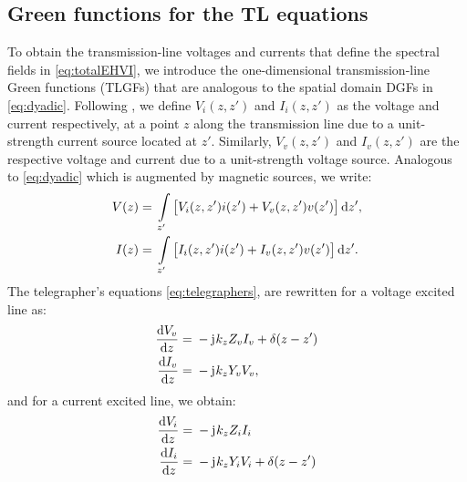 \documentclass[12pt]{article}
\begin{document}
\subsection{Green functions for the TL equations}
%
To obtain the transmission-line voltages and currents that define the spectral fields in \eqref{eq:totalEHVI}, we introduce the one-dimensional transmission-line Green functions (TLGFs) that are analogous to the spatial domain DGFs in \eqref{eq:dyadic}. Following \cite{Felsen1994,Michalski2005}, we define $V_i(z,z')$ and $I_i(z,z')$ as the voltage and current respectively, at a point $z$ along the transmission line due to a unit-strength current source located at $z'$. Similarly, $V_v(z,z')$ and $I_v(z,z')$ are the respective voltage and current due to a unit-strength voltage source. Analogous to \eqref{eq:dyadic} which is augmented by magnetic sources, we write:
%
\begin{subequations}
  \begin{align}
    V(z) ={}& \int\limits_{z'} \left[ V_i(z,z') i(z') + V_v(z,z') v(z') \right] \mathop{}\!\mathrm{d}{z'},
    \label{eq:TLGF_V}\\
    I(z) ={}& \int\limits_{z'} \left[ I_i(z,z') i(z') + I_v(z,z') v(z') \right] \mathop{}\!\mathrm{d}{z'}.
    \label{eq:TLGF_I}
  \end{align}
  \label{eq:TLGF_analogy}%
\end{subequations}
%
The telegrapher's equations \eqref{eq:telegraphers}, are rewritten for a voltage excited line as:
%
\begin{subequations}
  \begin{align}
    \dv{V_v}{z} ={}& -\mathrm{j}\mkern1mu k_z Z_v I_v + \delta(z - z')
    \label{eq:TLGF_V_v}\\
    \dv{I_v}{z} ={}& -\mathrm{j}\mkern1mu k_z Y_v V_v,
    \label{eq:TLGF_I_v}
  \end{align}
  \label{eq:TLGF_v_telelgraphers}%
\end{subequations}
%
and for a current excited line, we obtain:
%
\begin{subequations}
  \begin{align}
    \dv{V_i}{z} ={}& -\mathrm{j}\mkern1mu k_z Z_i I_i
    \label{eq:TLGF_V_i}\\
    \dv{I_i}{z} ={}& -\mathrm{j}\mkern1mu k_z Y_i V_i + \delta(z - z')
    \label{eq:TLGF_I_i}
  \end{align}
  \label{eq:TLGF_i_telelgraphers}%
\end{subequations}
%
\end{document}
